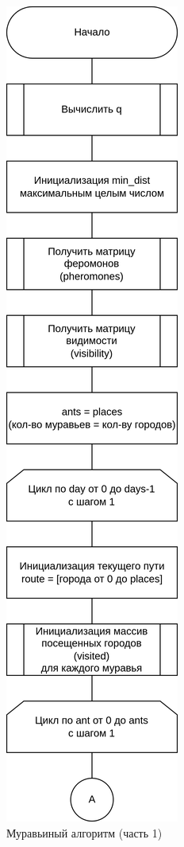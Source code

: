 \begin{figure}[h]
	\centering
	\includegraphics[height=0.9\textheight]{imgs/ant1.drawio}
	\caption{Муравьиный алгоритм (часть 1)}
	\label{fig:ants-1}
\end{figure}

